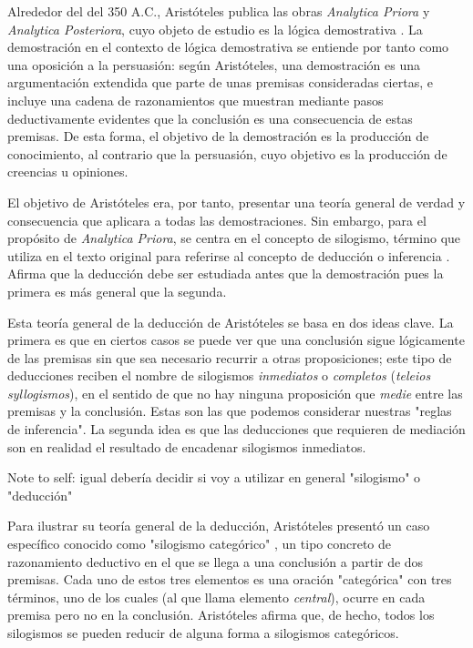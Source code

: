 \documentclass{article}
\begin{document}
Alrededor del del 350 A.C., Aristóteles publica las obras \textit{Analytica Priora} y \textit{Analytica Posteriora}, cuyo objeto de estudio es la lógica demostrativa \cite{smith1989prior}. La demostración en el contexto de lógica demostrativa se entiende por tanto como una oposición a la persuasión: según Aristóteles, una demostración es una argumentación extendida que parte de unas premisas consideradas ciertas, e incluye una cadena de razonamientos que muestran mediante pasos deductivamente evidentes que la conclusión es una consecuencia de estas premisas. De esta forma, el objetivo de la demostración es la producción de conocimiento, al contrario que la persuasión, cuyo objetivo es la producción de creencias u opiniones. \cite{corcoran2009aristotle}

El objetivo de Aristóteles era, por tanto, presentar una teoría general de verdad y consecuencia que aplicara a todas las demostraciones. Sin embargo, para el propósito de \textit{Analytica Priora}, se centra en el concepto de silogismo, término que utiliza en el texto original para referirse al concepto de deducción o inferencia \cite{ross1964aristotle}. Afirma que la deducción debe ser estudiada antes que la demostración pues la primera es más general que la segunda. \cite{smith1989prior}

Esta teoría general de la deducción de Aristóteles se basa en dos ideas clave. La primera es que en ciertos casos se puede ver que una conclusión sigue lógicamente de las premisas sin que sea necesario recurrir a otras proposiciones; este tipo de deducciones reciben el nombre de silogismos \textit{inmediatos} o \textit{completos} (\textit{teleios syllogismos}), en el sentido de que no hay ninguna proposición que \textit{medie} entre las premisas y la conclusión. Estas son las que podemos considerar nuestras "reglas de inferencia". La segunda idea es que las deducciones que requieren de mediación son en realidad el resultado de encadenar silogismos inmediatos. \cite{corcoran2009aristotle}

Note to self: igual debería decidir si voy a utilizar en general "silogismo" o "deducción"

Para ilustrar su teoría general de la deducción, Aristóteles presentó un caso específico conocido como "silogismo categórico" \cite{corcoran2009aristotle}, un tipo concreto de razonamiento deductivo en el que se llega a una conclusión a partir de dos premisas. Cada uno de estos tres elementos es una oración "categórica" con tres términos, uno de los cuales (al que llama elemento \textit{central}), ocurre en cada premisa pero no en la conclusión. Aristóteles afirma que, de hecho, todos los silogismos se pueden reducir de alguna forma a silogismos categóricos. \cite{smith1989prior}
\end{document}
